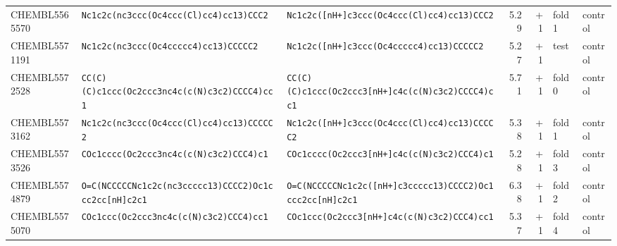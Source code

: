 \begin{longtable}{l p{4.4cm} p{4.4cm} r r l l}
CHEMBL5565570 & \texttt{Nc1c2c(\allowbreak{}nc3ccc(\allowbreak{}Oc4ccc(\allowbreak{}Cl)\allowbreak{}cc4)\allowbreak{}cc13)\allowbreak{}CCC2} & \texttt{Nc1c2c(\allowbreak{}[nH+]\allowbreak{}c3ccc(\allowbreak{}Oc4ccc(\allowbreak{}Cl)\allowbreak{}cc4)\allowbreak{}cc13)\allowbreak{}CCC2} & 5.29 & +1 & fold 1 & control \\
CHEMBL5571191 & \texttt{Nc1c2c(\allowbreak{}nc3ccc(\allowbreak{}Oc4ccccc4)\allowbreak{}cc13)\allowbreak{}CCCCC2} & \texttt{Nc1c2c(\allowbreak{}[nH+]\allowbreak{}c3ccc(\allowbreak{}Oc4ccccc4)\allowbreak{}cc13)\allowbreak{}CCCCC2} & 5.27 & +1 & test & control \\
CHEMBL5572528 & \texttt{CC(\allowbreak{}C)\allowbreak{}(\allowbreak{}C)\allowbreak{}c1ccc(\allowbreak{}Oc2ccc3nc4c(\allowbreak{}c(\allowbreak{}N)\allowbreak{}c3c2)\allowbreak{}CCCC4)\allowbreak{}cc1} & \texttt{CC(\allowbreak{}C)\allowbreak{}(\allowbreak{}C)\allowbreak{}c1ccc(\allowbreak{}Oc2ccc3[nH+]\allowbreak{}c4c(\allowbreak{}c(\allowbreak{}N)\allowbreak{}c3c2)\allowbreak{}CCCC4)\allowbreak{}cc1} & 5.71 & +1 & fold 0 & control \\
CHEMBL5573162 & \texttt{Nc1c2c(\allowbreak{}nc3ccc(\allowbreak{}Oc4ccc(\allowbreak{}Cl)\allowbreak{}cc4)\allowbreak{}cc13)\allowbreak{}CCCCC2} & \texttt{Nc1c2c(\allowbreak{}[nH+]\allowbreak{}c3ccc(\allowbreak{}Oc4ccc(\allowbreak{}Cl)\allowbreak{}cc4)\allowbreak{}cc13)\allowbreak{}CCCCC2} & 5.38 & +1 & fold 1 & control \\
CHEMBL5573526 & \texttt{COc1cccc(\allowbreak{}Oc2ccc3nc4c(\allowbreak{}c(\allowbreak{}N)\allowbreak{}c3c2)\allowbreak{}CCC4)\allowbreak{}c1} & \texttt{COc1cccc(\allowbreak{}Oc2ccc3[nH+]\allowbreak{}c4c(\allowbreak{}c(\allowbreak{}N)\allowbreak{}c3c2)\allowbreak{}CCC4)\allowbreak{}c1} & 5.28 & +1 & fold 3 & control \\
CHEMBL5574879 & \texttt{O=\allowbreak{}C(\allowbreak{}NCCCCCNc1c2c(\allowbreak{}nc3ccccc13)\allowbreak{}CCCC2)\allowbreak{}Oc1ccc2cc[nH]\allowbreak{}c2c1} & \texttt{O=\allowbreak{}C(\allowbreak{}NCCCCCNc1c2c(\allowbreak{}[nH+]\allowbreak{}c3ccccc13)\allowbreak{}CCCC2)\allowbreak{}Oc1ccc2cc[nH]\allowbreak{}c2c1} & 6.38 & +1 & fold 2 & control \\
CHEMBL5575070 & \texttt{COc1ccc(\allowbreak{}Oc2ccc3nc4c(\allowbreak{}c(\allowbreak{}N)\allowbreak{}c3c2)\allowbreak{}CCC4)\allowbreak{}cc1} & \texttt{COc1ccc(\allowbreak{}Oc2ccc3[nH+]\allowbreak{}c4c(\allowbreak{}c(\allowbreak{}N)\allowbreak{}c3c2)\allowbreak{}CCC4)\allowbreak{}cc1} & 5.37 & +1 & fold 4 & control \\

\end{longtable}
